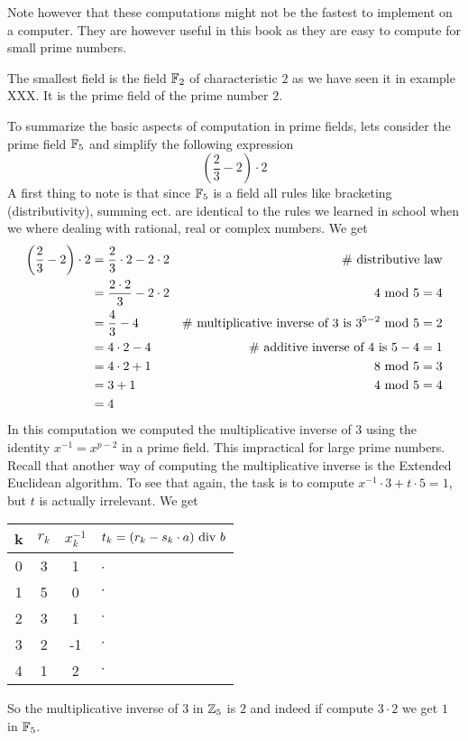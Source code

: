 Note however that these computations might not be the fastest to implement on a computer. They are however useful in this book as they are easy to compute for small prime numbers.
\begin{example}
The smallest field is the field $\mathbb{F}_2$ of characteristic $2$ as we have seen it in example XXX. It is the prime field of the prime number $2$.
\end{example}
\begin{example}
To summarize the basic aspects of computation in prime fields, lets consider the prime field $\mathbb{F}_5$ and simplify the following expression
$$\left(\frac{2}{3} - 2\right)\cdot 2 $$
A first thing to note is that since $\mathbb{F}_5$ is a field all rules like bracketing (distributivity), summing ect. are identical to the rules we learned in school when we where dealing with rational, real or complex numbers. We get
\begin{align*}
\left(\frac{2}{3} - 2\right)\cdot 2 &=
 \frac{2}{3}\cdot 2 - 2\cdot 2 & \text{\# distributive law}\\
 &= \frac{2\cdot 2}{3} - 2\cdot 2 & 4 \text{ mod } 5=4 \\
 &= \frac{4}{3} - 4 & \text{\# multiplicative inverse of 3 is } 3^{5-2} \text{ mod } 5=2\\
 &= 4\cdot 2 - 4 & \text{\# additive inverse of 4 is } 5-4=1\\
 &= 4\cdot 2 +1 & 8 \text{ mod } 5=3\\
 &= 3 +1 & 4 \text{ mod } 5=4\\
 &= 4
\end{align*}
In this computation we computed the multiplicative inverse of $3$ using the identity
$x^{-1}=x^{p-2}$ in a prime field. This impractical for large prime numbers. Recall that another way of computing the multiplicative inverse is the Extended Euclidean algorithm.  To see that again, the task is to compute $x^{-1}\cdot 3 + t \cdot 5 =1$, but $t$ is actually irrelevant. We get
\begin{center}
  \begin{tabular}{c | c c l}
    k & $ r_k $ & $ x^{-1}_k $ & $ t_k = (r_k-s_k \cdot a) \text{ div } b $ \\\hline
    0 & 3 & 1 & $\cdot$\ \\
    1 & 5 & 0 & $\cdot$ \\
    2 & 3 & 1 & $\cdot$ \\
    3 & 2 &-1 & $\cdot$ \\
    4 & 1 & 2  & $\cdot$ \\
  \end{tabular}
\end{center}
So the multiplicative inverse of $3$ in $\mathbb{Z}_5$ is $2$ and indeed if compute $3\cdot 2$ we get $1$ in $\mathbb{F}_5$.
\end{example}
